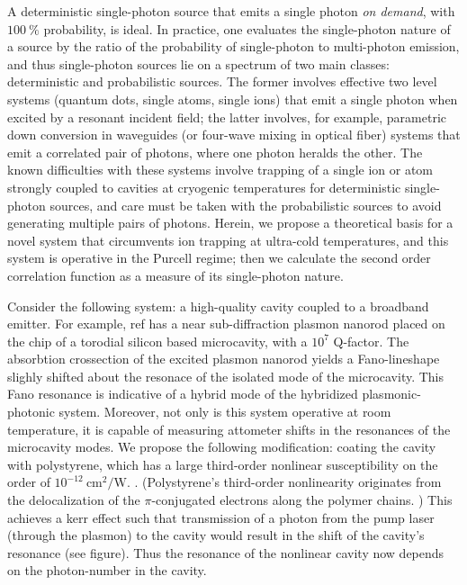 \documentclass[12pt]{article}
\begin{document}
A deterministic single-photon source that emits a single photon \textit{on demand}, 
with $100 \: \%$ probability, is ideal. In practice, one evaluates the 
single-photon nature of a source by the ratio of the probability of single-photon 
to multi-photon emission, and thus single-photon sources lie on a spectrum of 
two main classes: deterministic and probabilistic sources. \cite{lounis2005single, 
eisaman2011invited} The former involves effective two level systems (quantum
dots, single atoms, single ions) \cite{ShieldsAndrewJ2007Sqls, strauf2007high, 
hennrich2004photon, wilk2007single, maurer2004single} that emit a single photon when 
excited by a resonant incident field; the latter involves, for example, parametric 
down conversion in waveguides (or four-wave mixing in optical fiber) systems
\cite{u2004efficient, sharping2001observation, goldschmidt2008spectrally} 
that emit a correlated pair of photons, where one photon heralds the other. 
The known difficulties with these systems involve trapping of a single ion or atom 
strongly coupled to cavities at cryogenic temperatures for deterministic single-photon 
sources, and care must be taken with the probabilistic sources to avoid generating 
multiple pairs of photons. Herein, we propose a theoretical basis for a novel system that 
circumvents ion trapping at ultra-cold temperatures, and this system is operative in the 
Purcell regime; then we calculate the second order correlation function as a measure of 
its single-photon nature.

Consider the following system: a high-quality cavity coupled to a broadband emitter. 
For example, ref \cite{pan2019elucidating} has a near sub-diffraction plasmon nanorod 
placed on the chip of a torodial silicon based microcavity, with a $10^{7}$ Q-factor. 
The absorbtion crossection of the excited plasmon nanorod yields a Fano-lineshape slighly 
shifted about the resonace of the isolated mode of the microcavity. This Fano resonance 
is indicative of a hybrid mode of the hybridized plasmonic-photonic system. Moreover, 
not only is this system operative at room temperature, it is capable of measuring 
attometer shifts in the resonances of the microcavity modes. We propose the following 
modification: coating the cavity with polystyrene, which has a large third-order nonlinear susceptibility on the order of $10^{−12} \:\mathrm{cm}^2/\mathrm{W}$. 
\cite{qin2010design, liu200910}. (Polystyrene's third-order nonlinearity originates 
from the delocalization of the $\pi$-conjugated electrons along the polymer chains. 
\cite{krausz1989optical, wong1991studies}) This achieves a kerr effect such that 
transmission of a photon from the pump laser (through the plasmon) to the cavity would 
result in the shift of the cavity's resonance (see figure). Thus the resonance of the 
nonlinear cavity now depends on the photon-number in the cavity.
\end{document}
